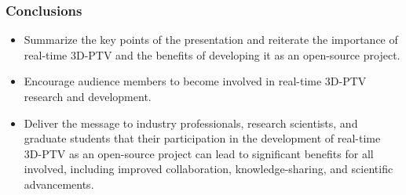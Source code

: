 \documentclass{beamer}
\begin{document}
\begin{frame}
\frametitle{Conclusions}
\begin{itemize}
\item Summarize the key points of the presentation and reiterate the importance of real-time 3D-PTV and the benefits of developing it as an open-source project.
\item Encourage audience members to become involved in real-time 3D-PTV research and development.
\item Deliver the message to industry professionals, research scientists, and graduate students that their participation in the development of real-time 3D-PTV as an open-source project can lead to significant benefits for all involved, including improved collaboration, knowledge-sharing, and scientific advancements.
\end{itemize}
\end{frame}


%
%
%
%
%
%
%
\end{document}
